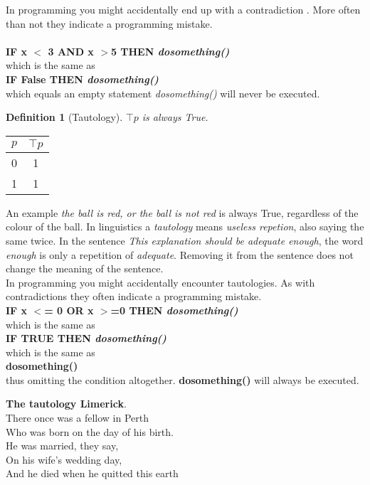 \documentclass[10pt,a4paper,draft,titlepage,onecolumn]{book}
\newtheorem{definition}{Definition}[subsection]
\begin{document}
In programming you might accidentally end up with a contradiction . More often than not they indicate a programming mistake. \\ \\
\textbf{IF x $<$ 3 AND  x $>$5  THEN \textit{dosomething()}}\\
which is the same as \\
\textbf{IF False THEN \textit{dosomething()}}\\
which equals an empty statement \textit{dosomething()} will never be executed.
\begin{definition}[Tautology]
$\top p $ is always True.
\end{definition}
\begin{center}
\begin{tabular}{ |c|c| }
 \hline
 $p$ & $\top p$  \\
 \hline
 0 & 1 \\
 1 & 1\\
 \hline
\end{tabular} 
\end{center} 
An example \textit{the ball is red, or the ball is not red} is always True, regardless of the colour of the ball.
In linguistics a \textit {tautology} means \textit{useless repetion}, also {saying the same twice}. In the sentence \textit{This explanation should be adequate enough}, the word \textit{enough} is only a repetition of \textit{adequate}. Removing it from the sentence does not change the meaning of the sentence. \\
In programming you might accidentally encounter tautologies. As with contradictions they often indicate a programming mistake. \\
\textbf{IF x $<$= 0 OR  x $>$=0 THEN \textit{dosomething()}}\\
which is the same as \\
\textbf{IF TRUE THEN \textit{dosomething()}}\\
which is the same as \\
\textbf{dosomething()}\\
thus omitting the condition altogether. \textbf{dosomething()} will always be executed.

\begin{center} 
\textbf{The tautology Limerick}.\\
There once was a fellow in Perth \\
Who was born on the day of his birth. \\
He was married, they say, \\
On his wife's wedding day, \\
And he died when he quitted this earth 
\end{center}
\end{document}
